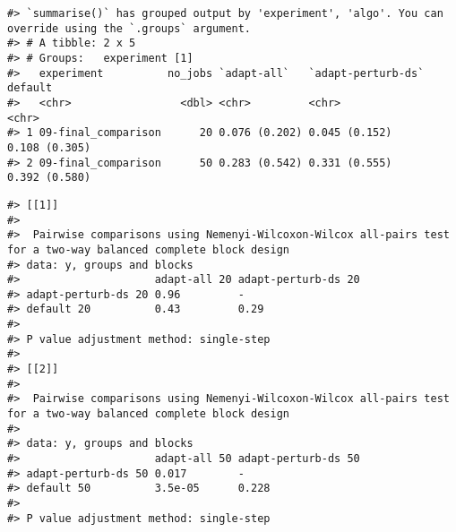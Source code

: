 \documentclass[
]{article}
\begin{document}
\begin{verbatim}
#> `summarise()` has grouped output by 'experiment', 'algo'. You can override using the `.groups` argument.
#> # A tibble: 2 x 5
#> # Groups:   experiment [1]
#>   experiment          no_jobs `adapt-all`   `adapt-perturb-ds` default      
#>   <chr>                 <dbl> <chr>         <chr>              <chr>        
#> 1 09-final_comparison      20 0.076 (0.202) 0.045 (0.152)      0.108 (0.305)
#> 2 09-final_comparison      50 0.283 (0.542) 0.331 (0.555)      0.392 (0.580)
\end{verbatim}

\begin{verbatim}
#> [[1]]
#> 
#>  Pairwise comparisons using Nemenyi-Wilcoxon-Wilcox all-pairs test for a two-way balanced complete block design
#> data: y, groups and blocks
#>                     adapt-all 20 adapt-perturb-ds 20
#> adapt-perturb-ds 20 0.96         -                  
#> default 20          0.43         0.29
#> 
#> P value adjustment method: single-step
#> 
#> [[2]]
#> 
#>  Pairwise comparisons using Nemenyi-Wilcoxon-Wilcox all-pairs test for a two-way balanced complete block design
#> 
#> data: y, groups and blocks
#>                     adapt-all 50 adapt-perturb-ds 50
#> adapt-perturb-ds 50 0.017        -                  
#> default 50          3.5e-05      0.228
#> 
#> P value adjustment method: single-step
\end{verbatim}
\end{document}
